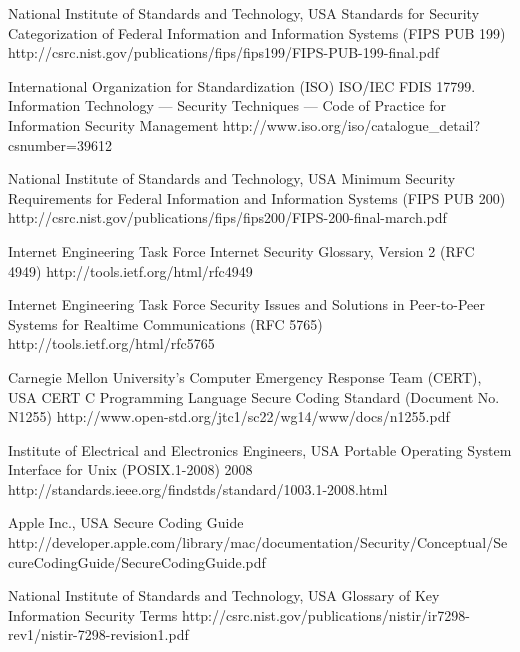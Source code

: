\begin{thebibliography}{9}
		{National Institute of Standards and Technology, USA}
		{Standards for Security Categorization of Federal Information and Information Systems ({FIPS PUB} 199)}
		{}
		{http://csrc.nist.gov/publications/fips/fips199/FIPS-PUB-199-final.pdf}
		
		{International Organization for Standardization (ISO)}
		{ISO/IEC FDIS 17799. Information Technology — Security Techniques — Code of Practice for Information Security Management}
		{}
		{http://www.iso.org/iso/catalogue_detail?csnumber=39612}
	
		{National Institute of Standards and Technology, USA}
		{Minimum Security Requirements for Federal Information and Information Systems ({FIPS PUB} 200)}
		{}
		{http://csrc.nist.gov/publications/fips/fips200/FIPS-200-final-march.pdf}
	
		{Internet Engineering Task Force}
		{Internet Security Glossary, Version 2 ({RFC} 4949)}
		{}
		{http://tools.ietf.org/html/rfc4949}
		
		{Internet Engineering Task Force}
		{Security Issues and Solutions in Peer-to-Peer Systems for Realtime Communications ({RFC} 5765)}
		{}
		{http://tools.ietf.org/html/rfc5765}
	
		{Carnegie Mellon University's Computer Emergency Response Team (CERT), USA}
		{{CERT} {C} Programming Language Secure Coding Standard (Document No. N1255)}
		{}
		{http://www.open-std.org/jtc1/sc22/wg14/www/docs/n1255.pdf}
		
		{Institute of Electrical and Electronics Engineers, USA}
		{Portable Operating System Interface for {U}nix ({POSIX}.1-2008)}
		{2008}
		{http://standards.ieee.org/findstds/standard/1003.1-2008.html}
		
		{Apple Inc., USA}
		{Secure Coding Guide}
		{}
		{http://developer.apple.com/library/mac/documentation/Security/Conceptual/SecureCodingGuide/SecureCodingGuide.pdf}

		{National Institute of Standards and Technology, USA}
		{Glossary of Key Information Security Terms}
		{}
		{http://csrc.nist.gov/publications/nistir/ir7298-rev1/nistir-7298-revision1.pdf}
		

\end{thebibliography}
